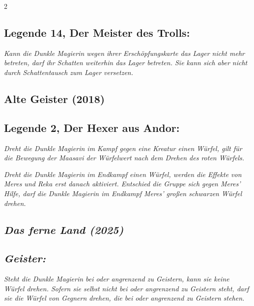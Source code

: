 \documentclass[10pt, a4paper, oneside]{book}
\newcommand{\fan}[1]{\textit{#1}}
\begin{document}
\begin{multicols*}{2}
\begin{bgcolor}
\subsection{Legende 14, Der Meister des Trolls:}

\fan{Kann die Dunkle Magierin wegen ihrer Erschöpfungskarte das Lager nicht mehr betreten, darf ihr Schatten weiterhin das Lager betreten. Sie kann sich aber nicht durch Schattentausch zum Lager versetzen.}
\supercite{40196}





\end{bgcolor}





\begin{bgcolor}[color-AG]
\section{Alte Geister (2018)}

\subsection{Legende 2, Der Hexer aus Andor:}

\fan{Dreht die Dunkle Magierin im Kampf gegen eine Kreatur einen Würfel, gilt für die Bewegung der Maasavi der Würfelwert nach dem Drehen des roten Würfels.}

\fan{Dreht die Dunkle Magierin im Endkampf einen Würfel, werden die Effekte von Meres und Reka erst danach aktiviert.  Entschied die Gruppe sich gegen Meres' Hilfe, darf die Dunkle Magierin im Endkampf Meres' großen schwarzen Würfel drehen.}

\end{bgcolor}




\begin{bgcolor}
\section{\fan{Das ferne Land (2025)}}

\subsection{\fan{Geister:}}

\fan{Steht die Dunkle Magierin bei oder angrenzend zu Geistern, kann sie keine Würfel drehen. Sofern sie selbst nicht bei oder angrenzend zu Geistern steht, darf sie die Würfel von Gegnern drehen, die bei oder angrenzend zu Geistern stehen.}

\end{bgcolor}


\end{multicols*}
\end{document}

